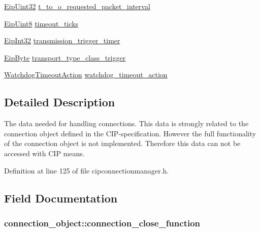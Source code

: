 \begin{DoxyCompactItemize}
\item 
\hyperlink{typedefs_8h_abf2dd49262551294eb990ef8746a2767}{\-Eip\-Uint32} \hyperlink{structconnection__object_adab05e9bb9a28f649747d8df7371d735}{t\-\_\-to\-\_\-o\-\_\-requested\-\_\-packet\-\_\-interval}
\item 
\hyperlink{typedefs_8h_aa0c108ee762a27720919a4634643040e}{\-Eip\-Uint8} \hyperlink{structconnection__object_a525118f58c4165d5abd9abc834096ab0}{timeout\-\_\-ticks}
\item 
\hyperlink{typedefs_8h_a3d850c4594f24c4fa1f1782e1034ee71}{\-Eip\-Int32} \hyperlink{structconnection__object_a8ff49ae39efff1f6e82d66bca01f995b}{transmission\-\_\-trigger\-\_\-timer}
\item 
\hyperlink{typedefs_8h_a168bac8db7e7e6d944700e1ac4717ae3}{\-Eip\-Byte} \hyperlink{structconnection__object_aee393bffe6bd92fb313db48832665254}{transport\-\_\-type\-\_\-class\-\_\-trigger}
\item 
\hyperlink{cipconnectionmanager_8h_adff469c95ce72ecc88c037dd76d39fe2}{\-Watchdog\-Timeout\-Action} \hyperlink{structconnection__object_a8585f871d912a74c4de0a0c3e1601843}{watchdog\-\_\-timeout\-\_\-action}
\end{DoxyCompactItemize}


\subsection{\-Detailed \-Description}
\-The data needed for handling connections. \-This data is strongly related to the connection object defined in the \-C\-I\-P-\/specification. \-However the full functionality of the connection object is not implemented. \-Therefore this data can not be accessed with \-C\-I\-P means. 

\-Definition at line 125 of file cipconnectionmanager.\-h.



\subsection{\-Field \-Documentation}
\hypertarget{structconnection__object_a51af396f09a2874cecd1d463c85e2a34}{
\subsubsection[{connection\-\_\-close\-\_\-function}]{ {\bf connection\-\_\-object\-::connection\-\_\-close\-\_\-function}}}\label{d1/d48/structconnection__object_a51af396f09a2874cecd1d463c85e2a34}


